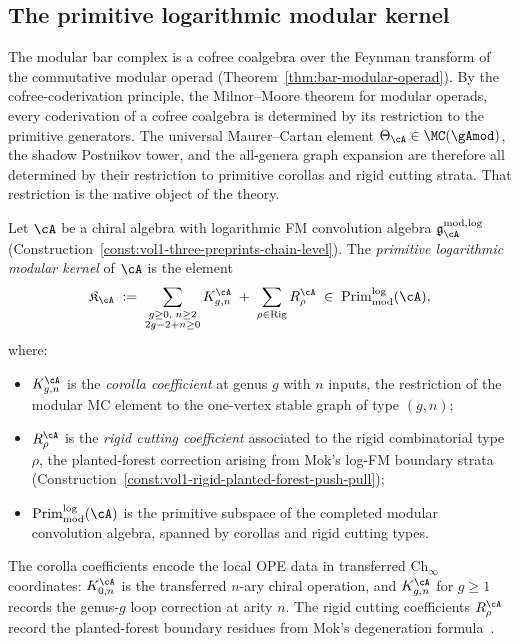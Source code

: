 
\subsection{The primitive logarithmic modular kernel}
\label{subsec:primitive-kernel-compression}

The modular bar complex is a cofree coalgebra over the
Feynman transform of the commutative modular operad
(Theorem~\ref{thm:bar-modular-operad}).
By the cofree-coderivation principle, the
Milnor--Moore theorem for modular operads,
every coderivation of a cofree coalgebra is determined by
its restriction to the primitive generators.
The universal Maurer--Cartan element
$\Theta_\cA \in \MC(\gAmod)$, the shadow Postnikov tower,
and the all-genera graph expansion are therefore all
determined by their restriction to primitive corollas and
rigid cutting strata.  That restriction is the native object
of the theory.

\begin{definition}
\label{def:primitive-log-modular-kernel}
Let $\cA$ be a chiral algebra with logarithmic FM convolution
algebra $\mathfrak{g}^{\mathrm{mod,log}}_\cA$
(Construction~\ref{const:vol1-three-preprints-chain-level}).
The \emph{primitive logarithmic modular kernel} of $\cA$ is
the element
\begin{equation}
\label{eq:primitive-kernel}
\mathfrak{K}_\cA
\;:=\;
\sum_{\substack{g \geq 0,\; n \geq 2 \\ 2g-2+n \geq 0}}
K_{g,n}^\cA
\;+\;
\sum_{\rho \in \operatorname{Rig}}
R_\rho^\cA
\;\in\;
\operatorname{Prim}^{\log}_{\mathrm{mod}}(\cA),
\end{equation}
where:
\begin{itemize}
\item $K_{g,n}^\cA$ is the \emph{corolla coefficient} at genus $g$
  with $n$ inputs, the restriction of the modular MC element to
  the one-vertex stable graph of type $(g,n)$;
\item $R_\rho^\cA$ is the \emph{rigid cutting coefficient} associated
  to the rigid combinatorial type $\rho$, the planted-forest
  correction arising from Mok's log-FM boundary strata
  (Construction~\ref{const:vol1-rigid-planted-forest-push-pull});
\item $\operatorname{Prim}^{\log}_{\mathrm{mod}}(\cA)$ is the
  primitive subspace of the completed modular convolution algebra,
  spanned by corollas and rigid cutting types.
\end{itemize}
The corolla coefficients encode the local OPE data in transferred
$\mathrm{Ch}_\infty$ coordinates: $K_{0,n}^\cA$ is the transferred
$n$-ary chiral operation, and $K_{g,n}^\cA$ for $g \geq 1$ records
the genus-$g$ loop correction at arity $n$.  The rigid cutting
coefficients $R_\rho^\cA$ record the planted-forest boundary residues
from Mok's degeneration formula~\cite[Corollary~5.3.4]{Mok25}.
\end{definition}

